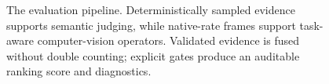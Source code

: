 \begin{figure}[t]
{
}
\caption{The \FORGE{} evaluation pipeline. Deterministically sampled evidence supports semantic judging, while native-rate frames support task-aware computer-vision operators. Validated evidence is fused without double counting; explicit gates produce an auditable ranking score and diagnostics.}
\label{fig:evaluation-pipeline}
\end{figure}
